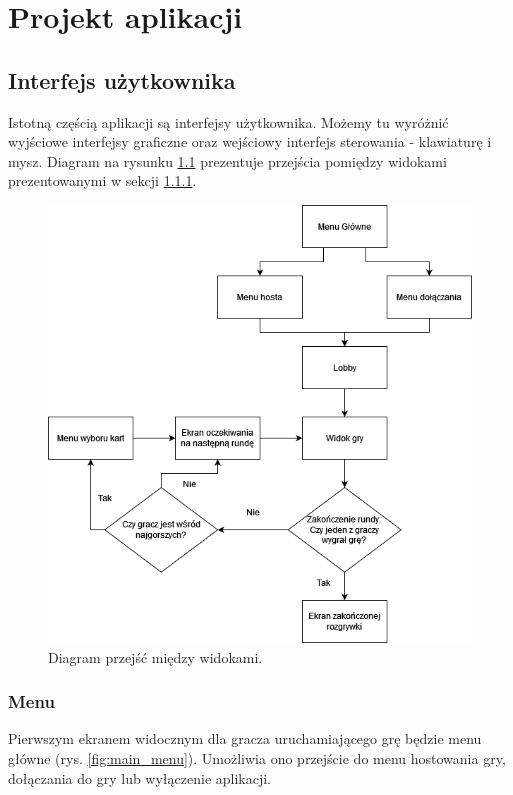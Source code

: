 \chapter{Projekt aplikacji}\label{ch:design}

\section{Interfejs użytkownika}\label{sec:interface_design}
Istotną częścią aplikacji są interfejsy użytkownika. Możemy tu wyróżnić wyjściowe interfejsy graficzne oraz wejściowy interfejs sterowania - klawiaturę i mysz. Diagram na rysunku \ref{fig:interface_diagram} prezentuje przejścia pomiędzy widokami prezentowanymi w sekcji \ref{sec:design_menu}.

\begin{figure}
    \centering
    \includegraphics[width=.8\linewidth]{Images/design/DiagramMenuTanks(1).png}
    \caption{Diagram przejść między widokami.}
    \label{fig:interface_diagram}
\end{figure}

\subsection{Menu}\label{sec:design_menu}
Pierwszym ekranem widocznym dla gracza uruchamiającego grę będzie menu główne (rys. \ref{fig:main_menu}). Umożliwia ono przejście do menu hostowania gry, dołączania do gry lub wyłączenie aplikacji. 

